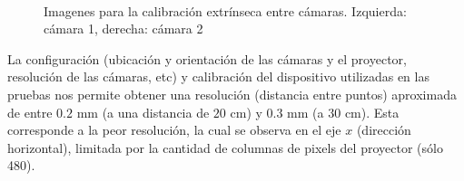 \begin{figure}[!bth]
       \\
        \caption{Imagenes para la calibración extrínseca entre cámaras. Izquierda: cámara 1, derecha: cámara 2}
        \label{fig:stereoCalibrationImages2}
\end{figure}


La configuración (ubicación y orientación de las cámaras y el proyector, resolución de las cámaras, etc) y calibración del dispositivo utilizadas en las pruebas nos permite obtener una resolución (distancia entre puntos) aproximada de entre $0.2$ mm (a una distancia de $20$ cm) y $0.3$ mm (a $30$ cm). Esta corresponde a la peor resolución, la cual se observa en el eje $x$ (dirección horizontal), limitada por la cantidad de columnas de pixels del proyector (sólo 480).

